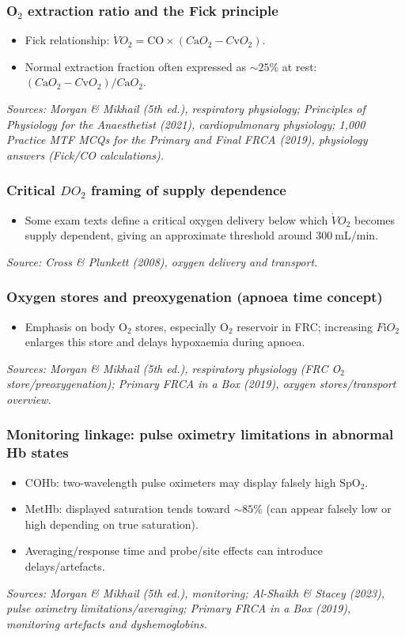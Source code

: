 \documentclass[11pt,a4paper]{article}
\begin{document}
\subsubsection{O\(_2\) extraction ratio and the Fick principle}
\begin{itemize}
  \item Fick relationship: \(\dot V\!O_2 = \mathrm{CO}\times (C\mathrm{a}O_2 - C\mathrm{v}O_2)\).
  \item Normal extraction fraction often expressed as \(\sim 25\%\) at rest: \((C\mathrm{a}O_2 - C\mathrm{v}O_2)/C\mathrm{a}O_2\).
\end{itemize}
\textit{Sources: Morgan \& Mikhail (5th ed.), respiratory physiology; Principles of Physiology for the Anaesthetist (2021), cardiopulmonary physiology; 1,000 Practice MTF MCQs for the Primary and Final FRCA (2019), physiology answers (Fick/CO calculations).}

\subsubsection{Critical \(D\!O_2\) framing of supply dependence}
\begin{itemize}
  \item Some exam texts define a critical oxygen delivery below which \(\dot V\!O_2\) becomes supply dependent, giving an approximate threshold around \(300~\mathrm{mL/min}\).
\end{itemize}
\textit{Source: Cross \& Plunkett (2008), oxygen delivery and transport.}

\subsubsection{Oxygen stores and preoxygenation (apnoea time concept)}
\begin{itemize}
  \item Emphasis on body O\(_2\) stores, especially O\(_2\) reservoir in FRC; increasing \(F\mathrm{i}O_2\) enlarges this store and delays hypoxaemia during apnoea.
\end{itemize}
\textit{Sources: Morgan \& Mikhail (5th ed.), respiratory physiology (FRC O\(_2\) store/preoxygenation); Primary FRCA in a Box (2019), oxygen stores/transport overview.}

\subsubsection{Monitoring linkage: pulse oximetry limitations in abnormal Hb states}
\begin{itemize}
  \item COHb: two-wavelength pulse oximeters may display falsely high SpO\(_2\).
  \item MetHb: displayed saturation tends toward \(\sim 85\%\) (can appear falsely low or high depending on true saturation).
  \item Averaging/response time and probe/site effects can introduce delays/artefacts.
\end{itemize}
\textit{Sources: Morgan \& Mikhail (5th ed.), monitoring; Al-Shaikh \& Stacey (2023), pulse oximetry limitations/averaging; Primary FRCA in a Box (2019), monitoring artefacts and dyshemoglobins.}
\end{document}
